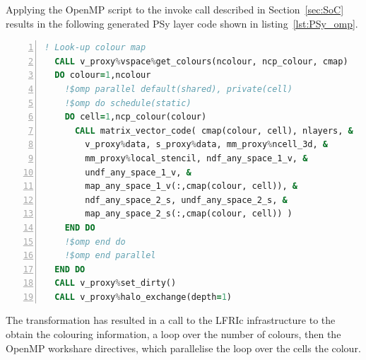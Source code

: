\documentclass[review,times]{elsarticle}
\begin{document}
%
%
%
%

Applying the OpenMP script to the invoke call described in
Section~\ref{sec:SoC} results in the following generated PSy layer
code shown in listing~\ref{lst:PSy_omp}. 
\begin{lstlisting}[language=Fortran, numbers=left,caption={Code 
fragment of the generated PSy layer},label={lst:PSy_omp}]
  ! Look-up colour map
  CALL v_proxy%vspace%get_colours(ncolour, ncp_colour, cmap)
  DO colour=1,ncolour
    !$omp parallel default(shared), private(cell)
    !$omp do schedule(static)
    DO cell=1,ncp_colour(colour)
      CALL matrix_vector_code( cmap(colour, cell), nlayers, &
        v_proxy%data, s_proxy%data, mm_proxy%ncell_3d, & 
        mm_proxy%local_stencil, ndf_any_space_1_v, &
        undf_any_space_1_v, &
        map_any_space_1_v(:,cmap(colour, cell)), &
        ndf_any_space_2_s, undf_any_space_2_s, &
        map_any_space_2_s(:,cmap(colour, cell)) )
    END DO 
    !$omp end do
    !$omp end parallel
  END DO 
  CALL v_proxy%set_dirty()
  CALL v_proxy%halo_exchange(depth=1)
\end{lstlisting}
The transformation has resulted in a call to the LFRIc infrastructure
to the obtain the colouring information, a loop over the number of
colours, then the OpenMP workshare directives, which parallelise the
loop over the cells the colour.
\end{document}
